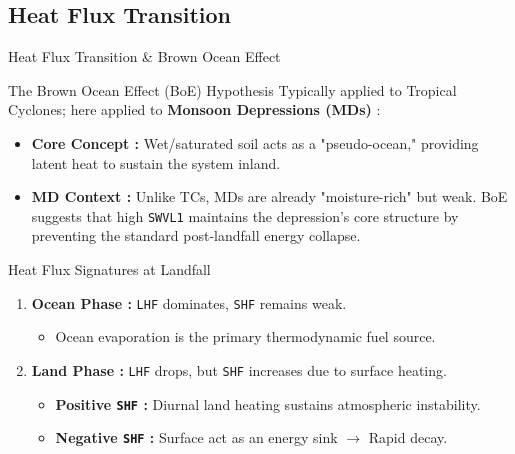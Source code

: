 \documentclass[8pt, aspectratio=169]{beamer}
\begin{document}
\subsection{Heat Flux Transition}
\begin{frame}{Heat Flux Transition \& Brown Ocean Effect}
    \footnotesize
    \begin{block}{The Brown Ocean Effect (BoE) Hypothesis}
        Typically applied to Tropical Cyclones; here applied to \textbf{Monsoon Depressions (MDs)} :
        \begin{itemize}
            \item \textbf{Core Concept :} Wet/saturated soil acts as a "pseudo-ocean," providing latent heat to sustain the system inland.
            \item \textbf{MD Context :} Unlike TCs, MDs are already "moisture-rich" but weak. BoE suggests that high \texttt{SWVL1} maintains the depression's core structure by preventing the standard post-landfall energy collapse.
        \end{itemize}
    \end{block}

    \begin{block}{Heat Flux Signatures at Landfall}
        \begin{enumerate}
            \item \textbf{Ocean Phase :} \texttt{LHF} dominates, \texttt{SHF} remains weak.
            \footnotesize
            \begin{itemize}
                \item Ocean evaporation is the primary thermodynamic fuel source.
            \end{itemize}
            \item \textbf{Land Phase :} \texttt{LHF} drops, but \texttt{SHF} increases due to surface heating.
            \begin{itemize}
                \footnotesize
                \item \textbf{Positive \texttt{SHF} :} Diurnal land heating sustains atmospheric instability.
                \item \textbf{Negative \texttt{SHF} :} Surface act as an energy sink $\rightarrow$ Rapid decay.
            \end{itemize}
        \end{enumerate}
    \end{block}


\end{frame}
\end{document}
